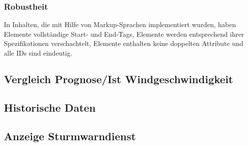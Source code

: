 \subsubsection*{Robustheit}
 In Inhalten, die mit Hilfe von Markup-Sprachen implementiert wurden, haben Elemente vollständige Start- und End-Tags, Elemente werden entsprechend ihrer Spezifikationen verschachtelt, Elemente enthalten keine doppelten Attribute und alle IDs sind eindeutig. 
 
 
 




\subsection{Vergleich Prognose/Ist Windgeschwindigkeit}


\subsection{Historische Daten}


\subsection{Anzeige Sturmwarndienst}
